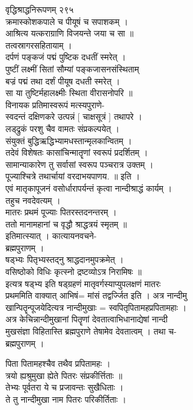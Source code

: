 \documentclass[11pt, openany]{book}
\begin{document}
{{{{ वृद्धिश्राद्धनिरूपणम् \textbar{} २९५\\
क्रमास्कोशकपाले च पीयूषं च सपाशकम् ।\\
आश्रित्य यत्कराग्राणि विजयन्ते जया च सा ॥\\
तत्वस्रागरसहितायाम् ।\\
दर्पणं पङ्कजं पद्मं पुष्टिक दधतीं स्मरेत् ।\\
पुष्टीं लक्ष्मीं सितां सौम्यां पङ्कजासनसंस्थिताम् \textbar{}\textbar{}\\
बज्रं पद्मं तथा दर्शं पीयूष दधती स्मरेत् ।\\
सा या तुष्टिर्महालक्ष्मीः स्थिता वीरासनोपरि ॥\\
विनायक प्रतिमास्वरूपं मत्स्यपुराणे-\\
स्वदन्तं दक्षिणकरे उत्पन्नं {[} चाक्षसूत्रं {]} तथापरे ।\\
लड्द्रुकं परशु चैव वामतः संप्रकल्पयेत् ।\\
संयुक्तं बुद्धिऋद्धिभ्यामधस्तान्मृलकान्वितम् ।\\
तदेवं विशेषतः कासांचिन्मातॄणां स्वरूपं प्रदर्शितम् ।\\
सामान्याकारेण तु सर्वासां स्वरूप पञ्चरात्र उक्तम् ।\\
पूज्याश्चित्रे तथार्चायां वरदाभयपाणय. ॥ इति ।\\
एवं मातृकापूजनं वसोर्धारापर्यन्तं कृत्वा नान्दीश्राद्धं कार्यम् ।\\
तहुच नवदेवत्यम् ।\\
मातरः प्रथमं पूज्याः पितरस्तदनन्तरम् ।\\
ततो मानामहानां च वृद्धौ श्राद्धत्रयं स्मृतम् ॥\\
इतिमात्स्यात् । कात्यायनवचने-\\
ब्रह्मपुराणम् ।\\
षड्भ्यः पितृभ्यस्तद्नु श्राद्धदानमुपक्रमेत् ।\\
वसिष्ठोको विधिः कृत्स्नो द्रष्टव्योऽत्र निरामिषः ॥\\
इत्यत्र षड्भ्य इति षड्ग्रहणं मातृवर्गस्याप्युपलक्षणं मातरः\\
प्रथममिति वाक्यात् \textbar{} आभिषं= मांसं तद्वर्ज्जित इति । अत्र
नान्दीमु\\
खान्पितॄन्पूजयेदित्यत्र नान्दीमुखाः = स्वपितृपितामहप्रपितामहाः ।\\
अत्र केचिन्नान्दीमुखानां पितॄणां देवतात्वाभिधानाद्येषां नान्दी\\
मुखसंज्ञा विहितास्ति ब्रह्मपुराणे तेषामेव देवतात्वम् । तथा च-\\
ब्रह्मपुराणम् ।

{ पिता पितामहश्चैव तथैव प्रपितामहः ।\\
त्रयो ह्यश्रुमुखा ह्येते पितरः संप्रकीर्त्तिताः ॥\\
तेभ्यः पूर्वतरा ये च प्रजावन्तः सुखैधिताः ।\\
ते तु नान्दीमुखा नाम पितरः परिकीर्तिताः ।

}}}}}
\end{document}
